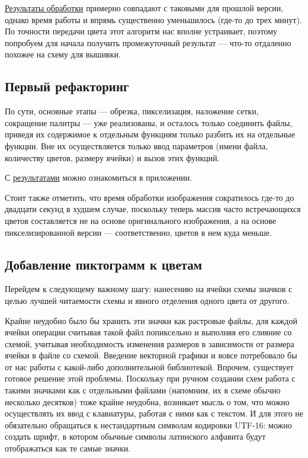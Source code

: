 \documentclass[12pt]{article}
\begin{document}
{	
	
	\hyperref[reduced_clasters_hex_cats]{Результаты обработки} примерно совпадают с таковыми для прошлой версии, однако время работы и впрямь существенно уменьшилось (где-то до трех минут). По точности передачи цвета этот алгоритм нас вполне устраивает, поэтому попробуем для начала получить промежуточный результат --- что-то отдаленно похожее на схему для вышивки. 
	
	\subsection{Первый рефакторинг}
	
	По сути, основные этапы --- обрезка, пикселизация, наложение сетки, сокращение палитры --- уже реализованы, и осталось только соединить файлы, приведя их содержимое к отдельным функциям только разбить их на отдельные функции. Вне их осуществляется только ввод параметров (имени файла, количеству цветов, размеру ячейки) и вызов этих функций.
	
	
	
	С \hyperref[refactoring1_cats]{результатами} можно ознакомиться в приложении. 
	
	Стоит также отметить, что время обработки изображения сократилось где-то до двадцати секунд в худшем случае, поскольку теперь массив часто встречающихся цветов составляется не на основе оригинального изображения, а на основе пикселизированной версии --- соответственно, цветов в нем куда меньше.
	
	\subsection{Добавление пиктограмм к цветам}
	
	Перейдем к следующему важному шагу: нанесению на ячейки схемы значков с целью лучшей читаемости схемы и явного отделения одного цвета от другого.
	
	Крайне неудобно было бы хранить эти значки как растровые файлы, для каждой ячейки операции считывая такой файл попиксельно и выполняя его слияние со схемой, учитывая необходимость изменения размеров в зависимости от размера ячейки в файле со схемой. Введение векторной графики и вовсе потребовало бы от нас работы с какой-либо дополнительной библиотекой. Впрочем, существует готовое решение этой проблемы. Поскольку при ручном создании схем работа с такими значками как с отдельными файлами (напомним, их в схеме обычно несколько десятков) тоже крайне неудобна, возникает мысль о том, что можно осуществлять их ввод с клавиатуры, работая с ними как с текстом. И для этого не обязательно обращаться к нестандартным символам кодировки UTF-16: можно создать шрифт, в котором обычные символы латинского алфавита будут отображаться как те самые значки.
	
}
\end{document}
